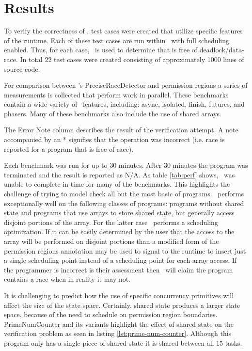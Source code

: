 \section{Results}
To verify the correctness of \hjv, test cases were created that utilize specific
features of the runtime. Each of these test cases are run within \jpf\ with full
scheduling enabled. Thus, for each case, \jpf\ is used to determine that 
\hjv is free of deadlock/data-race. In total 22 test cases were created
consisting of approximately 1000 lines of source code.

For comparison between \jpf's PreciseRaceDetector and permission regions a
series of measurements is collected that perform work in parallel.
These benchmarks contain a wide variety of \hj\ features, including: async,
isolated, finish, futures, and phasers. Many of these benchmarks also include
the use of shared arrays. 

The Error Note column describes the result of the verification attempt. A note
accompanied by an * signifies that the operation was incorrect (i.e. race is
reported for a program that is free of race).

Each benchmark was run for up to 30 minutes. After 30 minutes the program was
terminated and the result is reported as N/A. As table \ref{tab:perf} shows, \jpf\ was
unable to complete in time for many of the benchmarks. This highlights the
challenge of trying to model check all but the most basic of programs. \jpfhj\
performs exceptionally well on the following classes of programs: programs without
shared state and programs that use arrays to store shared state, but generally
access disjoint portions of the array. For the latter case \jpfhj\ performs a
scheduling optimization. If it can be easily determined by the user that the
access to the array will be performed on disjoint portions than a modified form
of the permission regions annotation may be used to signal to the runtime to
insert just a single scheduling point instead of a scheduling point for each
array access. If the programmer is incorrect is their assessment then \jpfhj\
will claim the program contains a race when in reality it may not.

It is challenging to predict how the use of specific concurrency
primitives will affect the size of the state space. Certainly, shared state
produces a larger state space, because of the need to schedule on permission
region boundaries. PrimeNumCounter and its variants highlight the effect of
shared state on the verification problem as seen in
listing \ref{lst:prime-num-counter}. Although this program only has a single
piece of shared state it is shared between all 15 tasks. 

